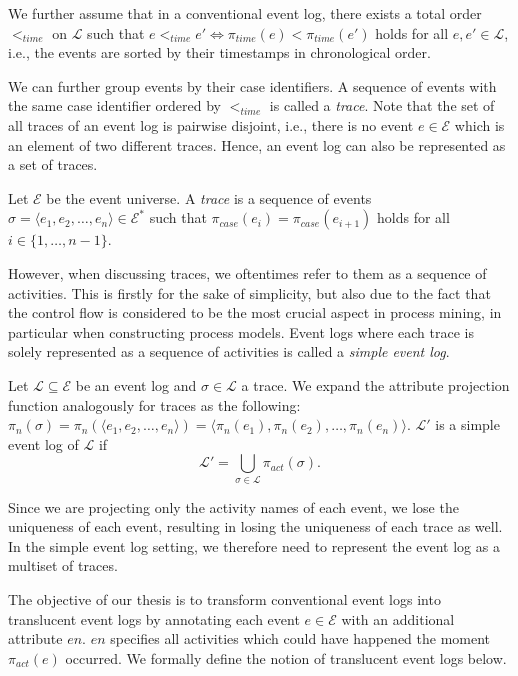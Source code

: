 We further assume that in a conventional event log, there exists a total order $<_{time}$ on $\mathcal{L}$ such that $e <_{time} e' \iff \pi_{time}(e) < \pi_{time}(e')$ holds for all $e, e' \in \mathcal{L}$, i.e., the events are sorted by their timestamps in chronological order.

We can further group events by their case identifiers. A sequence of events with the same case identifier ordered by $<_{time}$ is called a \emph{trace}. Note that the set of all traces of an event log is pairwise disjoint, i.e., there is no event $e \in \mathcal{E}$ which is an element of two different traces. Hence, an event log can also be represented as a set of traces.

\begin{definition}[Trace]
    Let $\mathcal{E}$ be the event universe. A \emph{trace} is a sequence of events $\sigma = \langle e_1, e_2, \dots, e_n \rangle \in \mathcal{E}^*$ such that $\pi_{case}(e_i) = \pi_{case}(e_{i+1})$ holds for all $i \in \{1, \dots, n-1\}$.
\end{definition}

However, when discussing traces, we oftentimes refer to them as a sequence of activities. This is firstly for the sake of simplicity, but also due to the fact that the control flow is considered to be the most crucial aspect in process mining, in particular when constructing process models. Event logs where each trace is solely represented as a sequence of activities is called a \emph{simple event log}.

\begin{definition}
    Let $\mathcal{L} \subseteq \mathcal{E}$ be an event log and $\sigma \in \mathcal{L}$ a trace. We expand the attribute projection function analogously for traces as the following: $\pi_n(\sigma) = \pi_n(\langle e_1, e_2, \dots, e_n \rangle) = \langle \pi_n(e_1), \pi_n(e_2), \dots, \pi_n(e_n) \rangle$. $\mathcal{L'}$ is a simple event log of $\mathcal{L}$ if
    \[
        \mathcal{L'} = \bigcup\limits_{\sigma \in \mathcal{L}} \pi_{act}(\sigma).
    \]
\end{definition}

Since we are projecting only the activity names of each event, we lose the uniqueness of each event, resulting in losing the uniqueness of each trace as well. In the simple event log setting, we therefore need to represent the event log as a multiset of traces.

The objective of our thesis is to transform conventional event logs into translucent event logs by annotating each event $e \in \mathcal{E}$ with an additional attribute $en$. $en$ specifies all activities which could have happened the moment $\pi_{act}(e)$ occurred. We formally define the notion of translucent event logs below.

